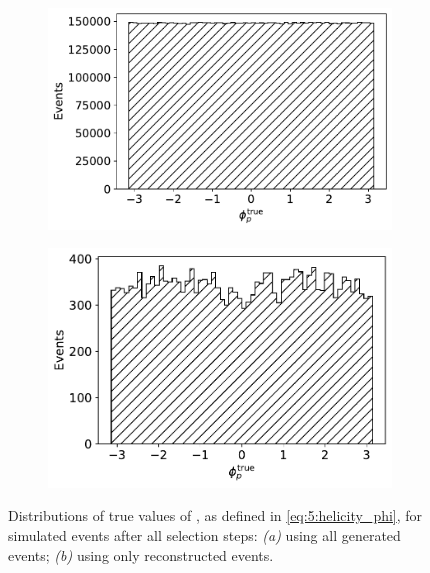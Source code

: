 \begin{figure}[t]
	\centering
	\begin{subfigure}{.45\textwidth}
		\includegraphics[height=.2\textheight]{graphics/05-angular_distributions/MCTRUTH_phi_true.pdf}
		\caption{}
		\label{fig:5:MCTRUTH_phi_true}
	\end{subfigure}
	\begin{subfigure}{.45\textwidth}
		\includegraphics[height=.2\textheight]{graphics/05-angular_distributions/MCRECO_phi_true.pdf}
		\caption{}
		\label{fig:5:MCRECO_phi_true}
	\end{subfigure}
	\caption{Distributions of true values of \phip, as defined in \eqref{eq:5:helicity_phi}, for simulated \demonstratorshort events after all selection steps: \textit{(a)} using all generated events; \textit{(b)} using only reconstructed events.}
	\label{fig:5:phi_distributions_true}
\end{figure}

